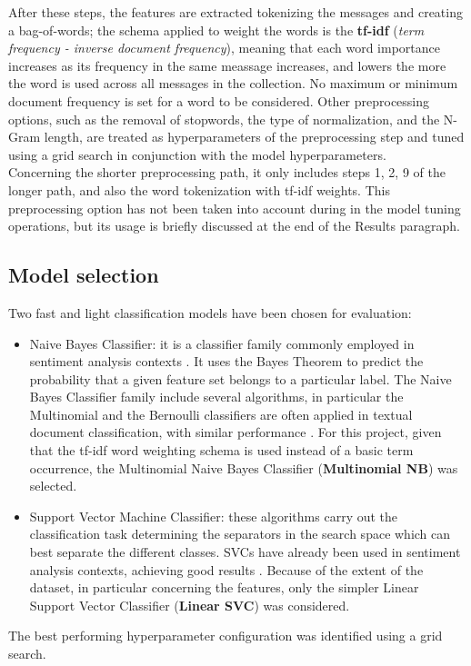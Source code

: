 \documentclass[conference]{IEEEtran}
\begin{document}
After these steps, the features are extracted tokenizing the messages and creating a bag-of-words; the schema applied to weight the words is the \textbf{tf-idf} (\textit{term frequency - inverse document frequency}), meaning that each word importance increases as its frequency in the same meassage increases, and lowers the more the word is used across all messages in the collection. No maximum or minimum document frequency is set for a word to be considered. Other preprocessing options, such as the removal of stopwords, the type of normalization, and the N-Gram length, are treated as hyperparameters of the preprocessing step and tuned using a grid search in conjunction with the model hyperparameters.\\
Concerning the shorter preprocessing path, it only includes steps 1, 2, 9 of the longer path, and also the word tokenization with tf-idf weights. This preprocessing option has not been taken into account during in the model tuning operations, but its usage is briefly discussed at the end of the Results paragraph. 
\subsection{Model selection}
Two fast and light classification models have been chosen for evaluation: 
\begin{itemize}
    \item Naive Bayes Classifier: it is a classifier family commonly employed in sentiment analysis contexts \cite{MEDHAT20141093}. It uses the Bayes Theorem to predict the probability that a given feature set belongs to a particular label. The Naive Bayes Classifier family include several algorithms, in particular the Multinomial and the Bernoulli classifiers are often applied in textual document classification, with similar performance \cite{8776800}. For this project, given that the tf-idf word weighting schema is used instead of a basic term occurrence, the Multinomial Naive Bayes Classifier (\textbf{Multinomial NB}) was selected.
    \item Support Vector Machine Classifier: these algorithms carry out the classification task determining the separators in the search space which can best separate the different classes. SVCs have already been used in sentiment analysis contexts, achieving good results \cite{6914200}. Because of the extent of the dataset, in particular concerning the features, only the simpler Linear Support Vector Classifier (\textbf{Linear SVC}) was considered. 
\end{itemize}
The best performing hyperparameter configuration was identified using a grid search. 
\end{document}
